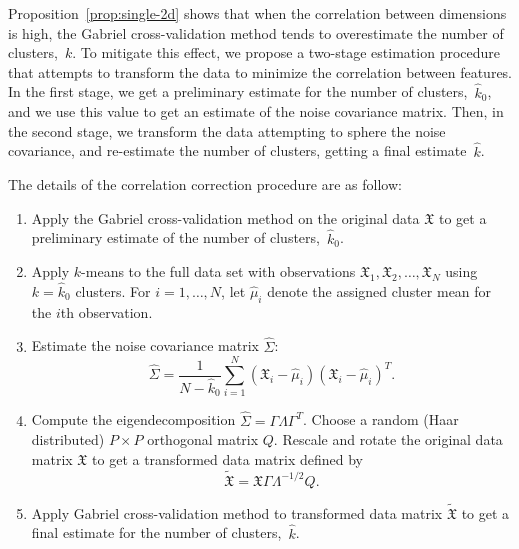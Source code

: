 \documentclass[12pt]{article}
\newcommand{\T}{T}
\newcommand{\dataX}{\mathfrak{X}}
\begin{document}
Proposition~\ref{prop:single-2d} shows that when the correlation between
dimensions is high, the Gabriel cross-validation method tends to overestimate
the number of clusters,~$k$. To mitigate this effect, we propose a two-stage
estimation procedure that attempts to transform the data to minimize the
correlation between features. In the first stage, we get a preliminary
estimate for the number of clusters,~$\hat k_0$, and we use this value to get
an estimate of the noise covariance matrix. Then, in the second stage, we
transform the data attempting to sphere the noise covariance, and re-estimate
the number of clusters, getting a final estimate~$\hat k$.

The details of the correlation correction procedure are as follow:

\begin{enumerate}

  \item Apply the Gabriel cross-validation method on the original data
    $\dataX$ to get a preliminary estimate of the number of
    clusters,~$\hat k_0$.

  \item Apply $k$-means to the full data set with observations
    $\dataX_1, \dataX_2, \dotsc, \dataX_N$ using $k = \hat k_0$ clusters.
    For $i = 1, \dotsc, N$, let $\hat \mu_i$ denote the assigned cluster
    mean for the $i$th observation.

	\item Estimate the noise covariance matrix $\hat{\Sigma}$:
    \[
      \hat{\Sigma}
        =
        \frac{1}{N - \hat k_0}
        \sum^N_{i=1}
        (\dataX_i-\hat{\mu}_i)(\dataX_i-\hat{\mu}_i)^\T.
    \]

  \item \label{step:transform}
    Compute the eigendecomposition $\hat{\Sigma} = \Gamma\Lambda\Gamma^\T$.
    Choose a random (Haar distributed) $P \times P$ orthogonal matrix $Q$.
    Rescale and rotate the original data matrix $\dataX$ to get a
    transformed data matrix defined by
    \[
      \tilde{\dataX} = \dataX\Gamma\Lambda^{-1/2}Q.
    \]

  \item Apply Gabriel cross-validation method to transformed data matrix
    $\tilde{\dataX}$ to get a final estimate for the number of
    clusters,~$\hat k$. 

\end{enumerate}
\end{document}
